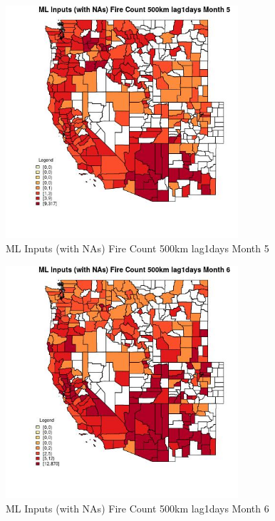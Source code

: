 \begin{figure} 
\centering  
\includegraphics[width=0.77\textwidth]{Code_Outputs/Report_ML_input_PM25_Step4_part_e_de_duplicated_aves_compiled_2019-05-21wNAs_CountyFire_Count_500km_lag1daysmedianMonth5.jpg} 
\caption{\label{fig:Report_ML_input_PM25_Step4_part_e_de_duplicated_aves_compiled_2019-05-21wNAsCountyFire_Count_500km_lag1daysmedianMonth5}ML Inputs (with NAs) Fire Count 500km lag1days Month 5} 
\end{figure} 
 

\begin{figure} 
\centering  
\includegraphics[width=0.77\textwidth]{Code_Outputs/Report_ML_input_PM25_Step4_part_e_de_duplicated_aves_compiled_2019-05-21wNAs_CountyFire_Count_500km_lag1daysmedianMonth6.jpg} 
\caption{\label{fig:Report_ML_input_PM25_Step4_part_e_de_duplicated_aves_compiled_2019-05-21wNAsCountyFire_Count_500km_lag1daysmedianMonth6}ML Inputs (with NAs) Fire Count 500km lag1days Month 6} 
\end{figure} 
 

